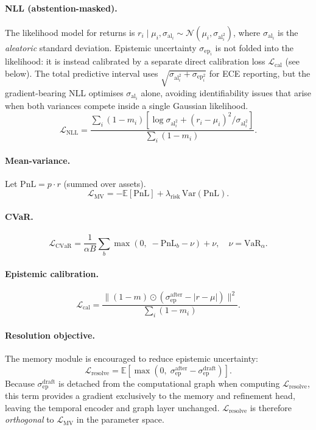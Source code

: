 \documentclass[11pt,a4paper]{article}
\newcommand{\sep}{\sigma_{\mathrm{ep}}}
\newcommand{\sal}{\sigma_{\mathrm{al}}}
\newcommand{\sepd}{\sigma_{\mathrm{ep}}^{\mathrm{draft}}}
\newcommand{\sepa}{\sigma_{\mathrm{ep}}^{\mathrm{after}}}
\newcommand{\Lres}{\mathcal{L}_{\mathrm{resolve}}}
\begin{document}
\paragraph{NLL (abstention-masked).}
The likelihood model for returns is $r_i \mid \mu_i, \sal_i \sim \mathcal{N}(\mu_i, \sal_i^2)$,
where $\sal_i$ is the \emph{aleatoric} standard deviation.  Epistemic uncertainty
$\sep_i$ is not folded into the likelihood: it is instead calibrated by a
separate direct calibration loss $\mathcal{L}_{\mathrm{cal}}$ (see below).
The total predictive interval uses $\sqrt{\sal_i^2 + \sep_i^2}$ for ECE
reporting, but the gradient-bearing NLL optimises $\sal_i$ alone, avoiding
identifiability issues that arise when both variances compete inside a single
Gaussian likelihood.
\begin{equation}
  \mathcal{L}_{\mathrm{NLL}} =
    \frac{\sum_{i} (1-m_i)\!\left[\log \sal_i^2 + (r_i - \mu_i)^2 / \sal_i^2\right]}
         {\sum_i (1 - m_i)}.
\end{equation}

\paragraph{Mean-variance.}
Let $\mathrm{PnL} = p \cdot r$ (summed over assets).
\begin{equation}
  \mathcal{L}_{\mathrm{MV}} = -\mathbb{E}[\mathrm{PnL}] + \lambda_{\mathrm{risk}}\,\mathrm{Var}(\mathrm{PnL}).
\end{equation}

\paragraph{CVaR.}
\begin{equation}
  \mathcal{L}_{\mathrm{CVaR}} = \frac{1}{\alpha B}\sum_b \max(0,\; -\mathrm{PnL}_b - \nu)
    + \nu, \quad \nu = \mathrm{VaR}_\alpha.
\end{equation}

\paragraph{Epistemic calibration.}
\begin{equation}
  \mathcal{L}_{\mathrm{cal}} =
    \frac{\|(1-m)\odot(\sepa - |r - \mu|)\|^2}{\sum_i (1-m_i)}.
\end{equation}

\paragraph{Resolution objective.}
The memory module is encouraged to reduce epistemic uncertainty:
\begin{equation}
  \Lres = \mathbb{E}\!\left[\max(0,\; \sepa - \sepd)\right].
\label{eq:lresolve}
\end{equation}
Because $\sepd$ is detached from the computational graph when computing
$\Lres$, this term provides a gradient exclusively to the memory and
refinement head, leaving the temporal encoder and graph layer unchanged.
$\Lres$ is therefore \emph{orthogonal} to $\mathcal{L}_{\mathrm{MV}}$ in the
parameter space.
\end{document}
